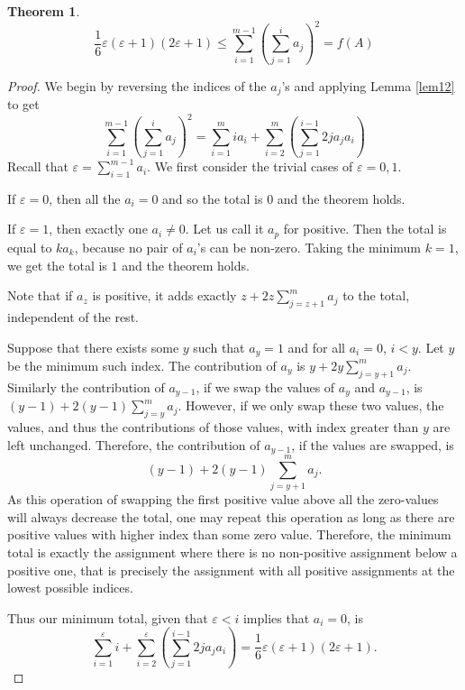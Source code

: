 \documentclass[12pt]{amsart}
\newtheorem{theorem}{Theorem}
\begin{document}
\begin{theorem}
\label{lem13}
	$$\frac{1}{6} \varepsilon (\varepsilon + 1) (2 \varepsilon+ 1) \leq \sum_{i=1}^{m-1} \left( \sum_{j=1}^{i} a_j \right)^2 = f(A)$$
\end{theorem}
\begin{proof}
	We begin by reversing the indices of the $a_j$'s and applying Lemma \ref{lem12} to get
	$$\sum_{i=1}^{m-1} \left( \sum_{j=1}^{i} a_j \right)^2 = \sum_{i=1}^{m} i a_i  + \sum_{i=2}^{m} \left( \sum_{j=1}^{i-1} 2 j a_j a_i \right)$$
	Recall that $\varepsilon = \sum_{i=1}^{m-1} a_i$.
	We first consider the trivial cases of $\varepsilon = 0, 1$.
	
		If $\varepsilon = 0$, then all the $a_i = 0$ and so the total is $0$ and the theorem holds.

		If $\varepsilon = 1$, then exactly one $a_i \neq 0$. Let us call it $a_p$ for positive. 
		Then the total is equal to $k a_k$, because no pair of $a_i$'s can be non-zero. 
		Taking the minimum $k = 1$, we get the total is $1$ and the theorem holds.

	Note that if $a_z$ is positive, it adds exactly $z + 2 z \sum_{j=z+1}^{m} a_j$ to the total, independent of the rest.
		
	Suppose that there exists some $y$ such that $a_y = 1$ and for all $a_i = 0$, $i < y$. Let $y$ be the minimum such index. 
		The contribution of $a_y$ is $y + 2 y \sum_{j=y+1}^{m} a_j$. Similarly the contribution of $a_{y-1}$, if we swap the values of $a_y$ and $a_{y-1}$, is $(y-1) + 2 (y-1) \sum_{j=y}^{m} a_j$. However, if we only swap these two values, the values, and thus the contributions of those values, with index greater than $y$ are left unchanged. 
		Therefore, the contribution of $a_{y-1}$, if the values are swapped, is $$(y-1) + 2 (y-1) \sum_{j=y+1}^{m} a_j.$$
		As this operation of swapping the first positive value above all the zero-values will always decrease the total, one may repeat this operation as long as there are positive values with higher index than some zero value.
		Therefore, the minimum total is exactly the assignment where there is no non-positive assignment below a positive one, that is precisely the assignment with all positive assignments at the lowest possible indices.

	Thus our minimum total, given that $\varepsilon < i$ implies that $a_i = 0$, is
	$$\sum_{i=1}^{\varepsilon} i + \sum_{i=2}^{\varepsilon} \left( \sum_{j=1}^{i-1} 2 j a_j a_i \right) = \frac{1}{6} \varepsilon (\varepsilon + 1) (2 \varepsilon+ 1).$$
\end{proof}
\end{document}
